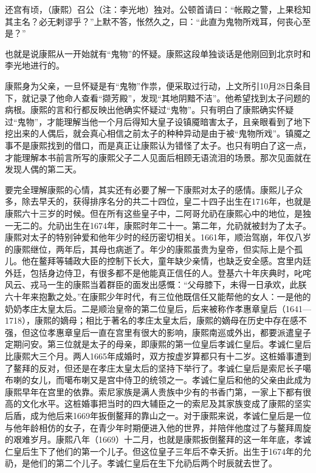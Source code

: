 \begin{bookquote}还宫有顷，（康熙）召公（注：李光地）独对。公顿首请曰：“帐殿之警，上果稔知其主名？必无剌谬乎？”上默不答，怅然久之，曰：“此直为鬼物所戏耳，何丧心至是？”\end{bookquote}


也就是说康熙从一开始就有“鬼物”的怀疑。康熙这段单独谈话是他刚回到北京时和李光地进行的。



康熙身为父亲，一旦怀疑是有“鬼物”作祟，便采取过行动，上文所引10月28日条目下，就记录了他命人查看“撷芳殿”，发现“其地阴黯不洁”。他希望找到太子问题的病根。康熙的言和行都反映出他确实怀疑过“鬼物”。只有明白了康熙确实怀疑过“鬼物”，才能理解当他一个月后得知大皇子设镇魇暗害太子，且亲眼看到了地下挖出来的人偶后，就会真心相信之前太子的种种异动是由于被“鬼物所戏”。镇魇之事不是康熙找到的借口，而是真正让康熙认为错怪了太子。也只有明白了这一点，才能理解本书前言所写的康熙父子二人见面后相顾无语流泪的场景。那次见面就在发现人偶的第二天。



要完全理解康熙的心情，其实还有必要了解一下康熙对太子的感情。康熙儿子众多，除去早夭的，获得排序名分的共二十四位，皇二十四子出生在1716年，也就是康熙六十三岁的时候。但在所有这些皇子中，二阿哥允礽在康熙心中的地位，是独一无二的。允礽出生在1674年，康熙时年二十一。第二年，允礽就被封为了太子。康熙对太子的特别钟爱和他年少时的经历密切相关。1661年，顺治驾崩，年仅八岁的康熙继位，两年后，其母也病逝了。年少的康熙虽贵为皇帝，但实际上是个孤儿。他在鳌拜等辅政大臣的控制下长大，童年缺少亲情，也缺乏安全感。宫里内廷外廷，包括身边侍卫，有很多都不是他能真正信任的人。登基六十年庆典时，叱咤风云、戎马一生的康熙当着群臣的面发出感慨：“父母膝下，未得一日承欢，此朕六十年来抱歉之处。”在康熙少年时代，有三位他既信任又能帮他的女人：一是他的奶奶孝庄太皇太后。二是顺治皇帝的第二位皇后，后来被称作孝惠章皇后（1641—1718），康熙的嫡母；相比于著名的孝庄太皇太后，康熙的嫡母在历史中存在感不强，但这位孝惠章皇后一直在宫里有很大的影响，康熙南巡或外出，都要派遣皇子定期问安。第三位就是太子的母亲，即康熙的第一位皇后孝诚仁皇后。孝诚仁皇后比康熙大三个月。两人1665年成婚时，双方按虚岁算都只有十二岁。这桩婚事遭到了鳌拜的反对，但还是在孝庄太皇太后的坚持下举行了。孝诚仁皇后是索尼长子噶布喇的女儿，而噶布喇又是宫中侍卫的统领之一。孝诚仁皇后和他的父亲由此成为康熙早年在宫里的依靠。索尼家族是满人贵族中少有的书香门第，一家上下都有很高的文化水平。这桩婚事把当时的四大辅臣之一的索尼及其家族变成了康熙的坚实后盾，成为他后来1669年扳倒鳌拜的靠山之一。对于康熙来说，孝诚仁皇后是一位与他年龄相仿的女子，在青少年时期便进入他的世界，并陪伴他度过了与鳌拜周旋的艰难岁月。康熙八年（1669）十二月，也就是康熙扳倒鳌拜的这一年年底，孝诚仁皇后生下了他们的第一个儿子。但这位皇子三年后不幸夭折。出生于1674年的允礽，是他们的第二个儿子。孝诚仁皇后在生下允礽后两个时辰就去世了。


